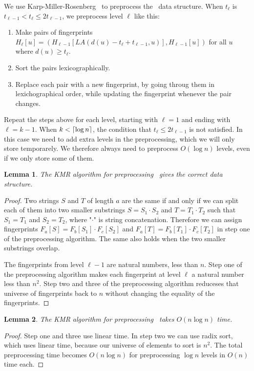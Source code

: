 \documentclass[a4]{article}
\newtheorem{lemma}{Lemma}
\begin{document}
We use Karp-Miller-Rosenberg~\cite{karp-miller-rosenberg} to preprocess the \tfprintk\ data structure. When $t_\ell$ is $t_{\ell-1} < t_\ell \leq 2t_{\ell-1}$, we preprocess level $\ell$ like this:
\begin{enumerate}
\item Make pairs of fingerprints $H_\ell[u] = (H_{\ell-1}[LA(d(u)-t_\ell+t_{\ell-1},u)], H_{\ell-1}[u])$ for all $u$ where $d(u) \geq t_\ell$.
\item Sort the pairs lexicographically.
\item Replace each pair with a new fingerprint, by going throug them in lexichographical order, while updating the fingerprint whenever the pair changes.
\end{enumerate}

Repeat the steps above for each level, starting with $\ell = 1$ and ending with $\ell = k-1$. When $k < \lceil\log n\rceil$, the condition that $t_\ell \leq 2t_{\ell-1}$ is not satisfied. In this case we need to add extra levels in the preprocessing, which we will only store temporarely. We therefore always need to preprocess $O(\log n)$ levels, even if we only store some of them.

\begin{lemma}
The KMR algorithm for preprocessing \tfprintk\ gives the correct data structure.
\end{lemma}
\begin{proof}
Two strings $S$ and $T$ of length $a$ are the same if and only if we can split each of them into two smaller substrings $S = S_1\cdot S_2$ and $T=T_1\cdot T_2$ such that $S_1=T_1$ and $S_2=T_2$, where "$\cdot$" is string concatenation. Therefore we can assign fingerprints $F_a[S]=F_b[S_1]\cdot F_c[S_2]$ and $F_a[T]=F_b[T_1]\cdot F_c[T_2]$ in step one of the preprocessing algorithm. The same also holds when the two smaller substrings overlap.

The fingerprints from level $\ell-1$ are natural numbers, less than $n$. Step one of the preprocessing algorithm makes each fingerprint at level $\ell$ a natural number less than $n^2$. Step two and three of the preprocessing algorithm reduceses that universe of fingerprints back to $n$ without changing the equality of the fingerprints.
\end{proof}

\begin{lemma}
The KMR algorithm for preprocessing \tfprintk\ takes $O(n\log n)$ time.
\end{lemma}
\begin{proof}
Step one and three use linear time. In step two we can use radix sort, which uses linear time, because our universe of elements to sort is $n^2$. The total preprocessing time becomes $O(n\log n)$ for preprocessing $\log n$ levels in $O(n)$ time each.
\end{proof}
\end{document}
